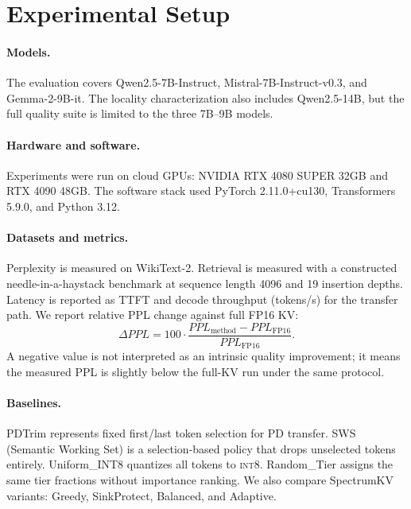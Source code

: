 \documentclass[11pt]{article}
\newcommand{\method}{SpectrumKV}
\newcommand{\ppl}{PPL}
\newcommand{\intviii}{\textsc{int8}}
\theoremstyle{plain}
\theoremstyle{definition}
\begin{document}
\section{Experimental Setup}
\label{sec:setup}

\paragraph{Models.}
The evaluation covers Qwen2.5-7B-Instruct, Mistral-7B-Instruct-v0.3, and Gemma-2-9B-it.  The locality characterization also includes Qwen2.5-14B, but the full quality suite is limited to the three 7B--9B models.

\paragraph{Hardware and software.}
Experiments were run on cloud GPUs: NVIDIA RTX 4080 SUPER 32GB and RTX 4090 48GB.  The software stack used PyTorch 2.11.0+cu130, Transformers 5.9.0, and Python 3.12.

\paragraph{Datasets and metrics.}
Perplexity is measured on WikiText-2.  Retrieval is measured with a constructed needle-in-a-haystack benchmark at sequence length 4096 and 19 insertion depths.  Latency is reported as TTFT and decode throughput (tokens/s) for the transfer path.  We report relative PPL change against full FP16 KV:
\begin{equation}
  \Delta \ppl = 100\cdot\frac{\ppl_{\mathrm{method}}-\ppl_{\mathrm{FP16}}}{\ppl_{\mathrm{FP16}}}.
\end{equation}
A negative value is not interpreted as an intrinsic quality improvement; it means the measured PPL is slightly below the full-KV run under the same protocol.

\paragraph{Baselines.}
PDTrim represents fixed first/last token selection for PD transfer.  SWS (Semantic Working Set) is a selection-based policy that drops unselected tokens entirely.  Uniform\_INT8 quantizes all tokens to \intviii{}.  Random\_Tier assigns the same tier fractions without importance ranking.  We also compare \method{} variants: Greedy, SinkProtect, Balanced, and Adaptive.
\end{document}

